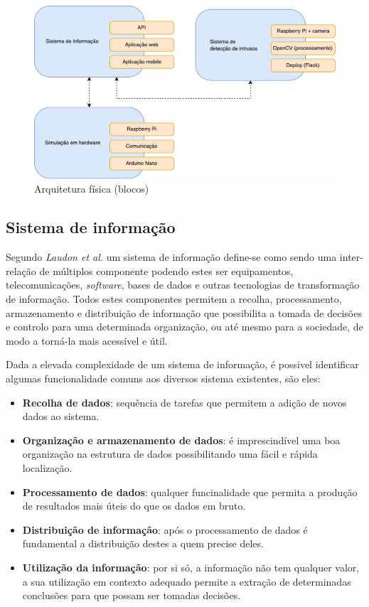 \begin{figure}[h]
	\centering
	\includegraphics[scale=0.45]{esquemas/esquema-blocos.pdf}
	\caption{Arquitetura física (blocos)}
	\label{fisicablocos}
\end{figure}


  
\subsection{Sistema de informação}


Segundo \textit{Laudon et al.}\cite{Laudon1998} um sistema de informação define-se como sendo uma inter-relação de múltiplos componente podendo estes ser equipamentos, telecomunicações, \textit{software}, bases de dados e outras tecnologias de transformação de informação. Todos estes componentes permitem a recolha, processamento, armazenamento e distribuição de informação que possibilita a tomada de decisões e controlo para uma determinada organização, ou até mesmo para a sociedade, de modo a torná-la mais acessível e útil.

Dada a elevada complexidade de um sistema de informação, é possivel identificar algumas funcionalidade comuns aos diversos sistema existentes, são eles\cite{Turban1996}: 

\begin{itemize}
	\item \textbf{Recolha de dados}: sequência de tarefas que permitem a adição de novos dados ao sistema.
	
	\item \textbf{Organização e armazenamento de dados}: é imprescindível uma boa organização na estrutura de dados possibilitando uma fácil e rápida localização.
	\item \textbf{Processamento de dados}: qualquer funcinalidade que permita a produção de resultados mais úteis do que os dados em bruto. 
	 
	\item \textbf{Distribuição de informação}: após o processamento de dados é fundamental a distribuição destes a quem precise deles.
	
	\item \textbf{Utilização da informação}: por si só, a informação não tem qualquer valor, a sua utilização em contexto adequado permite a extração de determinadas conclusões para que possam ser tomadas decisões.
	
\end{itemize}



